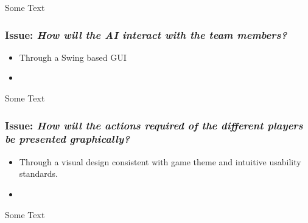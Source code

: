 Some Text

\subsubsection*{Issue: \textit{How will the AI interact with the team members?}}

  \begin{itemize}
    \item Through a Swing based GUI
    \item 
  \end{itemize}

Some Text

\subsubsection*{Issue: \textit{How will the actions required of the different players be presented graphically?}}

  \begin{itemize}
    \item Through a visual design consistent with game theme and intuitive usability standards.
    \item 
  \end{itemize}

Some Text
